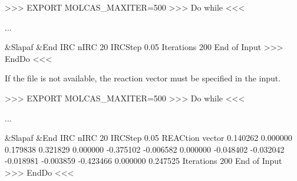 \begin{inputlisting}
>>> EXPORT MOLCAS_MAXITER=500
>>> Do while <<<

...

 &Slapaf &End
IRC
nIRC
 20
IRCStep
 0.05
Iterations
200
End of Input
>>> EndDo <<<
\end{inputlisting}

If the file  is not available, the reaction vector must be specified in the
input.

\begin{inputlisting}
>>> EXPORT MOLCAS_MAXITER=500
>>> Do while <<<

...

 &Slapaf &End
IRC
nIRC
 20
IRCStep
 0.05
 REACtion vector
   0.140262        0.000000        0.179838
   0.321829        0.000000       -0.375102
  -0.006582        0.000000       -0.048402
  -0.032042       -0.018981       -0.003859
  -0.423466        0.000000        0.247525
Iterations
200
End of Input
>>> EndDo <<<
\end{inputlisting}

